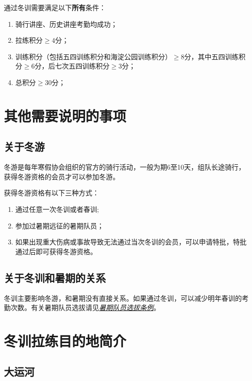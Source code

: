 \documentclass[UTF8]{ctexart}
\begin{document}
通过冬训需要满足以下\textbf{所有}条件：
\begin{enumerate}[nosep,left=4em]
    \item 骑行讲座、历史讲座考勤均成功；
    \item 拉练积分$\ge 4$分；
    \item 训练积分（包括五四训练积分和海淀公园训练积分）$\ge 8$分，其中五四训练积分$\ge 6$分，后七次五四训练积分$\ge 3$分；
    \item 总积分$\ge 30$分；
\end{enumerate}



\section{其他需要说明的事项}

\subsection{关于冬游}

冬游是每年寒假协会组织的官方的骑行活动，一般为期6至10天，组队长途骑行，获得冬游资格的会员才可以参加冬游。

获得冬游资格有以下三种方式：
\begin{enumerate}[nosep,left=2em]
    \item 通过任意一次冬训或者春训;
    \item 参加过暑期远征的暑期队员；
    \item 如果出现重大伤病或事故导致无法通过当次冬训的会员，可以申请特批，特批通过后即可获得冬游资格。
\end{enumerate}

\subsection{关于冬训和暑期的关系}

冬训主要影响冬游，和暑期没有直接关系。如果通过冬训，可以减少明年春训的考勤次数。有关暑期队员选拔请见\href{https://chexie.net/bbs/content/?bid=1&tid=5495&p=1}{\textit{暑期队员选拔条例}}。
\clearpage
\appendix

\section{冬训拉练目的地简介}

\subsection{大运河}
\end{document}
